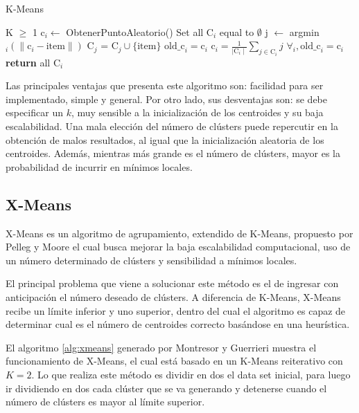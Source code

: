 \begin{algorithm}{}
\caption{K-Means \cite{montresordecentralized}}\label{alg:kmeans}
\begin{algorithmic}[1]
\Require K $\geq$ 1
\State c$_{i} \gets$ ObtenerPuntoAleatorio()
\EndFor
\Repeat 
\State Set all C$_{i}$ equal to $\emptyset$
\State j $\gets$ argmin$_{i}(\|{\textrm{c}_{i}-\textrm{item}}\|)$
\State C$_{j}$ = C$_{j} \cup \{\textrm{item}\}$
\EndFor
{}
\State $\textrm{old\_c}_{i} = \textrm{c}_{i}$
\State $\textrm{c}_{i} = \frac{1}{\mid{\textrm{C}_{i}}\mid} \displaystyle\sum_{j \in \textrm{C}_{i}}j$
\EndFor
\Until $\forall_i , \textrm{old\_c}_{i} = \textrm{c}_{i}$
\State \textbf{return} all C$_{i}$
\end{algorithmic}
\end{algorithm}

Las principales ventajas que presenta este algoritmo son: facilidad para ser implementado, simple y general. Por otro lado, sus desventajas son: se debe especificar un $k$, muy sensible a la inicialización de los centroides y su baja escalabilidad. Una mala elección del número de clústers puede repercutir en la obtención de malos resultados, al igual que la inicialización aleatoria de los centroides. Además, mientras más grande es el número de clústers, mayor es la probabilidad de incurrir en mínimos locales.

\subsection{X-Means}

X-Means es un algoritmo de agrupamiento, extendido de K-Means, propuesto por Pelleg y Moore \cite{Pelleg00x-means:extending} el cual busca mejorar la baja escalabilidad computacional, uso de un número determinado de clústers y sensibilidad a mínimos locales.

El principal problema que viene a solucionar este método es el de ingresar con anticipación el número deseado de clústers. A diferencia de K-Means, X-Means recibe un límite inferior y uno superior, dentro del cual el algoritmo es capaz de determinar cual es el número de centroides correcto basándose en una heurística.

El algoritmo \ref{alg:xmeans} generado por Montresor y Guerrieri \cite{montresordecentralized} muestra el funcionamiento de X-Means, el cual está basado en un K-Means reiterativo con $K=2$. Lo que realiza este método es dividir en dos el data set inicial, para luego ir dividiendo en dos cada clúster que se va generando y detenerse cuando el número de clústers es mayor al límite superior.

